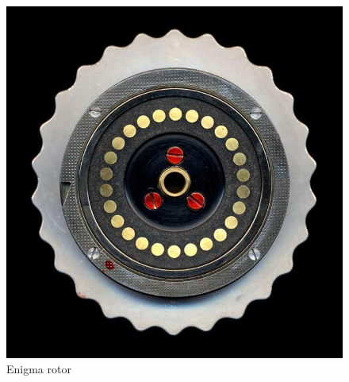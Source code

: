 \begin{figure}[H]
\begin{minipage}{0.48\textwidth}
        \vspace{4mm} %
        \includegraphics[width=0.8\linewidth]{paper/images/exit.jpg}
    \end{minipage}
    \caption{Enigma rotor}
    \label{fig:rotors}
\end{figure}

